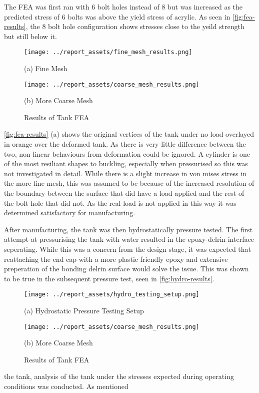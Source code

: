 The FEA was first ran with 6 bolt holes instead of 8 but was increased as the predicted stress of 6 bolts was above the yield stress of acrylic. As seen in \autoref{fig:fea-results}, the 8 bolt hole configuration shows stresses close to the yeild strength but still below it.
\begin{figure}[htbp]
    \centering

    \begin{minipage}{0.45\textwidth}
        \centering
        \texttt{[image: ../report\_assets/fine\_mesh\_results.png]}
        \caption*{(a) Fine Mesh}
    \end{minipage}    
    \hfill
    \begin{minipage}{0.45\textwidth}
        \centering
        \texttt{[image: ../report\_assets/coarse\_mesh\_results.png]}
        \caption*{(b) More Coarse Mesh}
    \end{minipage}    
    \caption{Results of Tank FEA}\label{fig:fea-results}

\end{figure}  
\autoref{fig:fea-results} (a) shows the original vertices of the tank under no load overlayed in orange over the deformed tank. As there is very little difference between the two, non-linear behaviours from deformation could be ignored. A cylinder is one of the most resiliant shapes to buckling, especially when pressurised so this was not investigated in detail. While there is a slight increase in von mises stress in the more fine mesh, this was assumed to be because of the increased resolution of the boundary between the surface that did have a load applied and the rest of the bolt hole that did not. As the real load is not applied in this way it was determined satisfactory for manufacturing.

After manufacturing, the tank was then hydrostatically pressure tested. The first attempt at pressurising the tank with water resulted in the epoxy-delrin interface seperating. While this was a concern from the design stage, it was expected that reattaching the end cap with a more plastic friendly epoxy and extensive preperation of the bonding delrin surface would solve the issue. This was shown to be true in the subsequent pressure test, seen in \autoref{fig:hydro-results}.
\begin{figure}[htbp]
    \centering

    \begin{minipage}{0.45\textwidth}
        \centering
        \texttt{[image: ../report\_assets/hydro\_testing\_setup.png]}
        \caption*{(a) Hydrostatic Pressure Testing Setup}
    \end{minipage}    
    \hfill
    \begin{minipage}{0.45\textwidth}
        \centering
        \texttt{[image: ../report\_assets/coarse\_mesh\_results.png]}
        \caption*{(b) More Coarse Mesh}
    \end{minipage}    
    \caption{Results of Tank FEA}\label{fig:hydro-results}

\end{figure}  
the tank, analysis of the tank under the stresses expected during operating conditions was conducted. As mentioned
